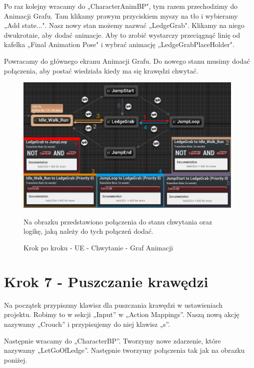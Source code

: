 \documentclass[openright]{xmgr}
\begin{document}
\newpage
Po raz kolejny wracamy do „CharacterAnimBP", tym razem przechodzimy do Animacji Grafu. Tam klikamy prawym przyciskiem myszy na tło i wybieramy „Add state...". Nasz nowy stan możemy nazwać „LedgeGrab". Klikamy na niego dwukrotnie, aby dodać animacje. Aby to zrobić wystarczy przeciągnąć linię od kafelka „Final Animation Pose" i wybrać animację „LedgeGrabPlaceHolder".

Powracamy do głównego ekranu Animacji Grafu. Do nowego stanu musimy dodać połączenia, aby postać wiedziała kiedy ma się krawędzi chwytać.

\begin{figure}[!htb]
    \begin{center}
    \includegraphics[scale=0.5]{Screeny/UeKrokPoKroku/UE-AnimGraph}
    \end{center}
    \caption{Krok po kroku - UE - Chwytanie - Graf Animacji}
    Na obrazku przedstawiono połączenia do stanu chwytania oraz logikę, jaką należy do tych połączeń dodać.
\end{figure}

\newpage

\section{Krok 7 - Puszczanie krawędzi}

Na początek przypiszmy klawisz dla puszczania krawędzi w ustawieniach projektu. Robimy to w sekcji „Input” w „Action Mappings”. Naszą nową akcję nazywamy „Crouch” i przypisujemy do niej klawisz „s”.

Następnie wracamy do „CharacterBP”. Tworzymy nowe zdarzenie, które nazywamy „LetGoOfLedge”. Następnie tworzymy połączenia tak jak na obrazku poniżej.
\end{document}
